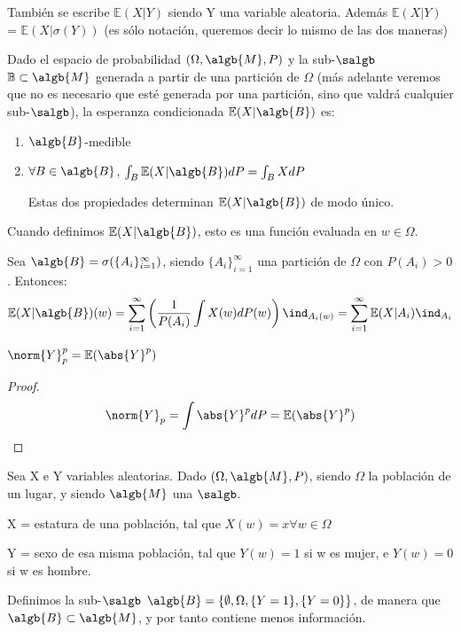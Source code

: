 \documentclass{apuntes}
\begin{document}
\obs También se escribe $\mathbb{E}(X|Y)$ siendo Y una variable aleatoria. Además $\mathbb{E}(X|Y)$ = $\mathbb{E}(X|\sigma(Y))$ (es sólo notación, queremos decir lo mismo de las dos maneras)


\begin{defn}
Dado el espacio de probabilidad $(\Omega, \algb{M}, P)$ y la sub-$\salgb$ $\mathbb{B}\subset\algb{M}$ generada a partir de una partición de $\Omega$ (más adelante veremos que no es necesario que esté generada por una partición, sino que valdrá cualquier  sub-$\salgb$), la esperanza condicionada $\mathbb{E}(X|\algb{B})$ es:
\begin{enumerate}
\item $\algb{B}$-medible
\item $\forall B \in \algb{B}$, $\int_{B}\mathbb{E}(X|\algb{B})dP=\int_{B}XdP$

Estas dos propiedades determinan $\mathbb{E}(X|\algb{B})$ de modo único.
\end{enumerate}
\end{defn}

\obs Cuando definimos $\mathbb{E}(X|\algb{B})$, esto es una función evaluada en $w \in \Omega$.

\obs Sea $\algb{B}=\sigma(\{A_i\}_{i=1}^{\infty})$, siendo $\{A_i\}_{i=1}^{\infty}$ una partición de $\Omega$ con $P(A_i)>0$. Entonces:
\[
\mathbb{E}(X|\algb{B})(w)=\sum_{i=1}^{\infty}\left( \frac{1}{P(A_i)}\int X(w)dP(w)\right)\ind_{A_i(w)}=\sum_{i=1}^{\infty}\mathbb{E}(X|A_i) \ind_{A_i}
\]

\obs $\norm{Y}_p^p = \mathbb{E}(\abs{Y}^p)$
\begin{proof}
\[
\norm{Y}_p = \int \abs{Y}^pdP =\mathbb{E}(\abs{Y}^p)
\]
\end{proof}



\begin{example}
Sea X e Y variables aleatorias. Dado $(\Omega, \algb{M}, P)$, siendo $\Omega$ la población de un lugar, y siendo $\algb{M}$ una $\salgb$.

X = estatura de una población, tal que $X(w)=x \forall w \in \Omega$

Y = sexo de esa misma población, tal que $Y(w)=1$ si w es mujer, e $Y(w)=0$ si w es hombre.

Definimos la sub-$\salgb$ $\algb{B}=\{\emptyset, \Omega, \{Y=1\}, \{Y=0\}\}$, de manera que $\algb{B} \subset \algb{M}$, y por tanto contiene menos información.
\end{example}
\end{document}
